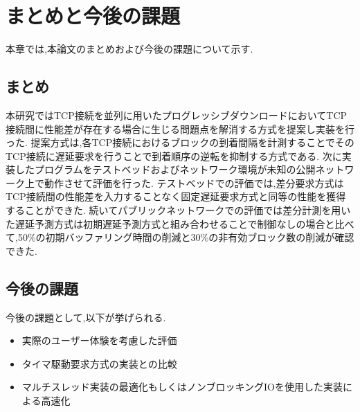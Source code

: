 \documentclass[a4j,12pt]{gradthesis_utf8}
\begin{document}
\newpage
 
\chapter{まとめと今後の課題}\label{matomekongo}
本章では,本論文のまとめおよび今後の課題について示す.
\section{まとめ}
本研究ではTCP接続を並列に用いたプログレッシブダウンロードにおいてTCP接続間に性能差が存在する場合に生じる問題点を解消する方式を提案し実装を行った.
提案方式は,各TCP接続におけるブロックの到着間隔を計測することでそのTCP接続に遅延要求を行うことで到着順序の逆転を抑制する方式である.
次に実装したプログラムをテストベッドおよびネットワーク環境が未知の公開ネットワーク上で動作させて評価を行った.
テストベッドでの評価では,差分要求方式はTCP接続間の性能差を入力することなく固定遅延要求方式と同等の性能を獲得することができた.
続いてパブリックネットワークでの評価では差分計測を用いた遅延予測方式は初期遅延予測方式と組み合わせることで制御なしの場合と比べて,50\%の初期バッファリング時間の削減と30\%の非有効ブロック数の削減が確認できた.


\section{今後の課題}
\hspace*{0.5em}今後の課題として,以下が挙げられる.
\begin{itemize}
    \item 実際のユーザー体験を考慮した評価
    \item タイマ駆動要求方式の実装との比較
    \item マルチスレッド実装の最適化もしくはノンブロッキングIOを使用した実装による高速化
\end{itemize}
\end{document}
